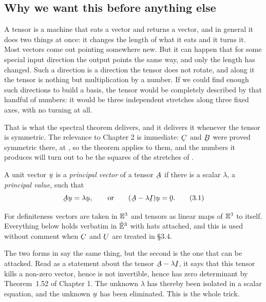 \subsection*{Why we want this before anything else}

A tensor is a machine that eats a vector and returns a vector, and in
general it does two things at once: it changes the length of what it eats
and it turns it. Most vectors come out pointing somewhere new. But it can
happen that for some special input direction the output points the same
way, and only the length has changed. Such a direction is a direction the
tensor does not rotate, and along it the tensor is nothing but
multiplication by a number. If we could find enough such directions to
build a basis, the tensor would be completely described by that handful of
numbers: it would be three independent stretches along three fixed axes,
with no turning at all.

That is what the spectral theorem delivers, and it delivers it whenever the
tensor is symmetric. The relevance to Chapter 2 is immediate: $\bC$ and
$\bB$ were proved symmetric there, at , so the theorem applies to
them, and the numbers it produces will turn out to be the squares of the
stretches of .

\begin{definition}\label{def:princ}
A unit vector $\bu$ is a \emph{principal vector} of a tensor $\bA$ if
there is a scalar $\lambda$, a \emph{principal value}, such that
\begin{equation}
   \bA\bu=\lambda\bu,\qquad\text{or}\qquad(\bA-\lambda\I)\bu=\bze .
   \tag{3.1}\label{eq:3.1}
\end{equation}
\end{definition}

For definiteness vectors are taken in $\mathbb{E}^{3}$ and tensors as linear maps of
$\mathbb{E}^{3}$ to itself. Everything below holds verbatim in $\hat{\mathbb{E}}^{3}$ with hats
attached, and this is used without comment when $\bC$ and $\bU$ are treated
in \S3.4.

\begin{remark}\label{rem:whysecond}
The two forms in  say the same thing, but the second is the one that
can be attacked. Read as a statement about the tensor $\bA-\lambda\I$, it
says that this tensor kills a non-zero vector, hence is not invertible,
hence has zero determinant by Theorem~1.52 of Chapter 1. The unknown
$\lambda$ has thereby been isolated in a scalar equation, and the unknown
$\bu$ has been eliminated. This is the whole trick.
\end{remark}

